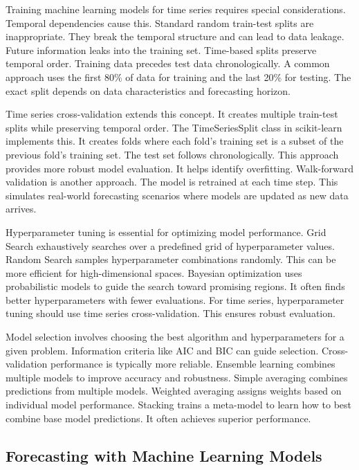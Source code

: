 Training machine learning models for time series requires special considerations. Temporal dependencies cause this. Standard random train-test splits are inappropriate. They break the temporal structure and can lead to data leakage. Future information leaks into the training set. Time-based splits preserve temporal order. Training data precedes test data chronologically. A common approach uses the first 80\% of data for training and the last 20\% for testing. The exact split depends on data characteristics and forecasting horizon.

Time series cross-validation extends this concept. It creates multiple train-test splits while preserving temporal order. The TimeSeriesSplit class in scikit-learn implements this. It creates folds where each fold's training set is a subset of the previous fold's training set. The test set follows chronologically. This approach provides more robust model evaluation. It helps identify overfitting. Walk-forward validation is another approach. The model is retrained at each time step. This simulates real-world forecasting scenarios where models are updated as new data arrives.

Hyperparameter tuning is essential for optimizing model performance. Grid Search exhaustively searches over a predefined grid of hyperparameter values. Random Search samples hyperparameter combinations randomly. This can be more efficient for high-dimensional spaces. Bayesian optimization uses probabilistic models to guide the search toward promising regions. It often finds better hyperparameters with fewer evaluations. For time series, hyperparameter tuning should use time series cross-validation. This ensures robust evaluation.

Model selection involves choosing the best algorithm and hyperparameters for a given problem. Information criteria like AIC and BIC can guide selection. Cross-validation performance is typically more reliable. Ensemble learning combines multiple models to improve accuracy and robustness. Simple averaging combines predictions from multiple models. Weighted averaging assigns weights based on individual model performance. Stacking trains a meta-model to learn how to best combine base model predictions. It often achieves superior performance.

\subsection{Forecasting with Machine Learning Models}

